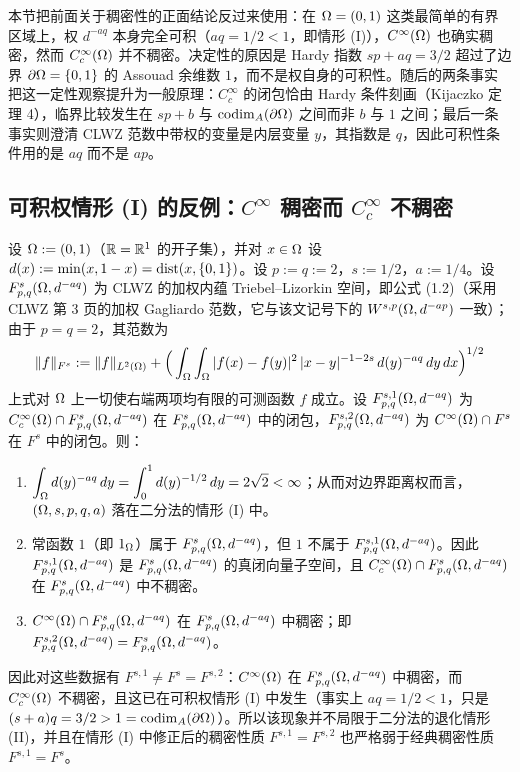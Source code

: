 
本节把前面关于稠密性的正面结论反过来使用：在 $\Omega=(0,1)$ 这类最简单的有界区域上，权 $d^{-aq}$ 本身完全可积（$aq=1/2<1$，即情形 (I)），$C^\infty(\Omega)$ 也确实稠密，然而 $C_c^\infty(\Omega)$ 并不稠密。决定性的原因是 Hardy 指数 $sp+aq=3/2$ 超过了边界 $\partial\Omega=\{0,1\}$ 的 Assouad 余维数 $1$，而不是权自身的可积性。随后的两条事实把这一定性观察提升为一般原理：$C_c^\infty$ 的闭包恰由 Hardy 条件刻画（Kijaczko 定理 4），临界比较发生在 $sp+b$ 与 $\operatorname{codim}_{A}(\partial\Omega)$ 之间而非 $b$ 与 $1$ 之间；最后一条事实则澄清 CLWZ 范数中带权的变量是内层变量 $y$，其指数是 $q$，因此可积性条件用的是 $aq$ 而不是 $ap$。

\subsection{可积权情形 (I) 的反例：\texorpdfstring{$C^\infty$}{C-infinity} 稠密而 \texorpdfstring{$C_c^\infty$}{Cc-infinity} 不稠密}

\begin{theorem}
设 $\Omega:=(0,1)$（$\mathbb{R}=\mathbb{R}^1$ 的开子集），并对 $x\in\Omega$ 设 $d(x):=\min(x,1-x)=\operatorname{dist}(x,\{0,1\})$。设 $p:=q:=2$，$s:=1/2$，$a:=1/4$。设 $F^{s}_{p,q}(\Omega,d^{-aq})$ 为 CLWZ 的加权内蕴 Triebel--Lizorkin 空间，即公式 (1.2)（采用 CLWZ 第 3 页的加权 Gagliardo 范数，它与该文记号下的 $W^{s,p}(\Omega,d^{-ap})$ 一致）；由于 $p=q=2$，其范数为
\[
  \|f\|_{F^s}:=\|f\|_{L^2(\Omega)}
  +\Big(\int_\Omega\int_\Omega|f(x)-f(y)|^2\,|x-y|^{-1-2s}\,d(y)^{-aq}\,dy\,dx\Big)^{1/2}
\]
上式对 $\Omega$ 上一切使右端两项均有限的可测函数 $f$ 成立。设 $F^{s,1}_{p,q}(\Omega,d^{-aq})$ 为 $C_c^\infty(\Omega)\cap F^{s}_{p,q}(\Omega,d^{-aq})$ 在 $F^{s}_{p,q}(\Omega,d^{-aq})$ 中的闭包，$F^{s,2}_{p,q}(\Omega,d^{-aq})$ 为 $C^\infty(\Omega)\cap F^s$ 在 $F^s$ 中的闭包。则：
\begin{enumerate}[label=(\roman*)]
  \item $\displaystyle\int_\Omega d(y)^{-aq}\,dy=\int_0^1 d(y)^{-1/2}\,dy=2\sqrt2<\infty$；从而对边界距离权而言，$(\Omega,s,p,q,a)$ 落在二分法的情形 (I) 中。
  \item 常函数 $1$（即 $1_\Omega$）属于 $F^{s}_{p,q}(\Omega,d^{-aq})$，但 $1$ 不属于 $F^{s,1}_{p,q}(\Omega,d^{-aq})$。因此 $F^{s,1}_{p,q}(\Omega,d^{-aq})$ 是 $F^{s}_{p,q}(\Omega,d^{-aq})$ 的真闭向量子空间，且 $C_c^\infty(\Omega)\cap F^{s}_{p,q}(\Omega,d^{-aq})$ 在 $F^{s}_{p,q}(\Omega,d^{-aq})$ 中不稠密。
  \item $C^\infty(\Omega)\cap F^{s}_{p,q}(\Omega,d^{-aq})$ 在 $F^{s}_{p,q}(\Omega,d^{-aq})$ 中稠密；即 $F^{s,2}_{p,q}(\Omega,d^{-aq})=F^{s}_{p,q}(\Omega,d^{-aq})$。
\end{enumerate}
因此对这些数据有 $F^{s,1}\neq F^s=F^{s,2}$：$C^\infty(\Omega)$ 在 $F^{s}_{p,q}(\Omega,d^{-aq})$ 中稠密，而 $C_c^\infty(\Omega)$ 不稠密，且这已在可积权情形 (I) 中发生（事实上 $aq=1/2<1$，只是 $(s+a)q=3/2>1=\operatorname{codim}_{A}(\partial\Omega)$）。所以该现象并不局限于二分法的退化情形 (II)，并且在情形 (I) 中修正后的稠密性质 $F^{s,1}=F^{s,2}$ 也严格弱于经典稠密性质 $F^{s,1}=F^s$。
\end{theorem}

